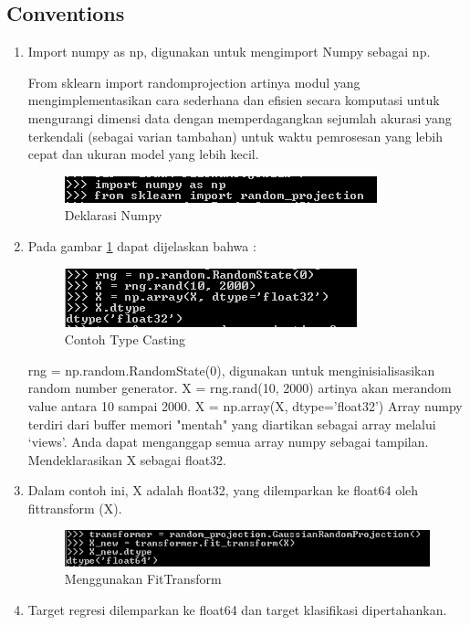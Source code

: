 \subsection{Conventions}
\begin{enumerate}
\item Import numpy as np, digunakan untuk mengimport Numpy sebagai np.

From sklearn import randomprojection artinya modul yang mengimplementasikan cara sederhana dan efisien secara komputasi untuk mengurangi dimensi data dengan memperdagangkan sejumlah akurasi yang terkendali (sebagai varian tambahan) untuk waktu pemrosesan yang lebih cepat dan ukuran model yang lebih kecil.
\begin{figure}
	\begin{center}
   	 \includegraphics[scale=1]{figures/tasya12.png}
   	 \caption{Deklarasi Numpy}	
	\end{center}
\end{figure}

\item Pada gambar \ref{1} dapat dijelaskan bahwa :
\begin{figure}
	\begin{center}
   	 \includegraphics[scale=1]{figures/tasya13.png}
   	 \caption{Contoh Type Casting}
     \label{1}	
	\end{center}
\end{figure}

rng = np.random.RandomState(0), digunakan untuk menginisialisasikan random number generator.
X = rng.rand(10, 2000) artinya akan merandom value antara 10 sampai 2000.
X = np.array(X, dtype='float32') Array numpy terdiri dari buffer memori "mentah" yang diartikan sebagai array melalui `views'. Anda dapat menganggap semua array numpy sebagai tampilan. Mendeklarasikan X sebagai float32.

\item Dalam contoh ini, X adalah float32, yang dilemparkan ke float64 oleh fittransform (X).
\begin{figure}
	\begin{center}
   	 \includegraphics[scale=0.6]{figures/tasya14.png}
   	 \caption{Menggunakan FitTransform}
	\end{center}
\end{figure}
\item Target regresi dilemparkan ke float64 dan target klasifikasi dipertahankan.


\end{enumerate}
